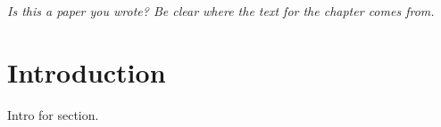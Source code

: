
\textit{Is this a paper you wrote?  Be clear where the text for the chapter comes from.}

\section{Introduction}
\label{c2_sec:Introduction}

Intro for section.  
